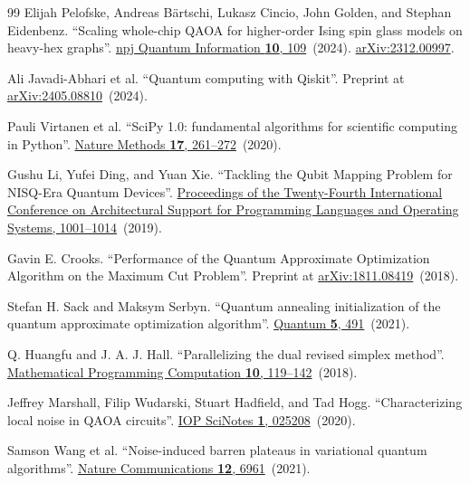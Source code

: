 \documentclass[a4paper,onecolumn,11pt,unpublished]{quantumarticle}
\theoremstyle{remark}
\begin{document}
\begin{thebibliography}{99}
Elijah Pelofske, Andreas B{\"a}rtschi, Lukasz Cincio, John Golden, and Stephan Eidenbenz.
\newblock ``Scaling whole-chip QAOA for higher-order Ising spin glass models on heavy-hex graphs''.
\newblock \href{https://dx.doi.org/10.1038/s41534-024-00906-w}{npj Quantum Information {\bf 10}, 109}~(2024).
\newblock \href{http://arxiv.org/abs/2312.00997}{arXiv:2312.00997}.

Ali Javadi-Abhari et al.
\newblock ``Quantum computing with Qiskit''.
\newblock Preprint at \href{https://arxiv.org/abs/2405.08810}{arXiv:2405.08810}~(2024).

Pauli Virtanen et al.
\newblock ``SciPy 1.0: fundamental algorithms for scientific computing in Python''.
\newblock \href{https://doi.org/10.1038/s41592-019-0686-2}{Nature Methods {\bf 17}, 261--272}~(2020).

Gushu Li, Yufei Ding, and Yuan Xie.
\newblock ``Tackling the Qubit Mapping Problem for NISQ-Era Quantum Devices''.
\newblock \href{https://doi.org/10.1145/3297858.3304023}{Proceedings of the Twenty-Fourth International Conference on Architectural Support for Programming Languages and Operating Systems, 1001--1014}~(2019).

Gavin E. Crooks.
\newblock ``Performance of the Quantum Approximate Optimization Algorithm on the Maximum Cut Problem''.
\newblock Preprint at \href{https://arxiv.org/abs/1811.08419}{arXiv:1811.08419}~(2018).

Stefan H. Sack and Maksym Serbyn.
\newblock ``Quantum annealing initialization of the quantum approximate optimization algorithm''.
\newblock \href{https://doi.org/10.22331/q-2021-07-01-491}{Quantum {\bf 5}, 491}~(2021).

Q. Huangfu and J. A. J. Hall.
\newblock ``Parallelizing the dual revised simplex method''.
\newblock \href{https://doi.org/10.1007/s12532-017-0130-5}{Mathematical Programming Computation {\bf 10}, 119--142}~(2018).

Jeffrey Marshall, Filip Wudarski, Stuart Hadfield, and Tad Hogg.
\newblock ``Characterizing local noise in QAOA circuits''.
\newblock \href{https://doi.org/10.1088/2633-1357/abb0d7}{IOP SciNotes {\bf 1}, 025208}~(2020).

Samson Wang et al.
\newblock ``Noise-induced barren plateaus in variational quantum algorithms''.
\newblock \href{https://doi.org/10.1038/s41467-021-27045-6}{Nature Communications {\bf 12}, 6961}~(2021).


\end{thebibliography}
\end{document}
